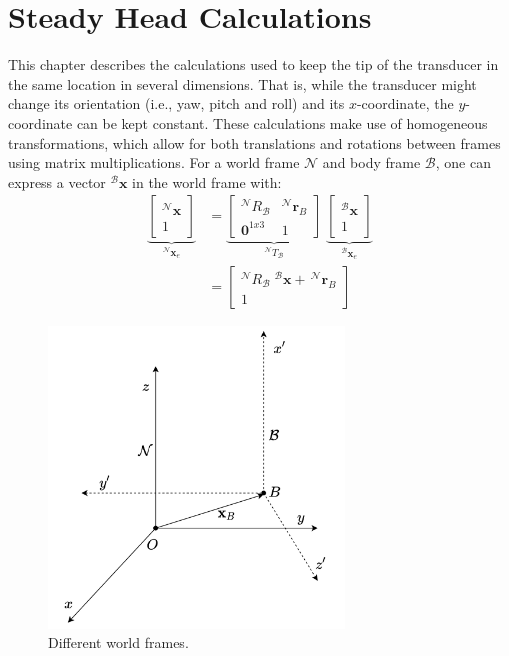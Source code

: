 \chapter{Steady Head Calculations}
\label{chap:SHC}
This chapter describes the calculations used to keep the tip of the transducer in the same location in several dimensions. That is, while the transducer might change its orientation (i.e., yaw, pitch and roll) and its $x$-coordinate, the $y$-coordinate can be kept constant. These calculations make use of homogeneous transformations, which allow for both translations and rotations between frames using matrix multiplications. For a world frame $\mathcal{N}$ and body frame $\mathcal{B}$, one can express a vector $^\mathcal{B}\mathbf{x}$ in the world frame with:
\begin{align}
    \underbrace{\left[\begin{array}{r} ^\mathcal{N}\mathbf{x}  \\ 1 \end{array}\right]}_{^\mathcal{N}\mathbf{x}_e}  &= \underbrace{\left[ \begin{array}{cc} ^\mathcal{N}R_\mathcal{B} &  ^\mathcal{N}\mathbf{r}_{B} \\ \mathbf{0}^{1x3} & 1 \end{array}  \right]}_{^\mathcal{N}T_\mathcal{B}} \; \underbrace{\left[\begin{array}{r} ^\mathcal{B}\mathbf{x}  \\ 1 \end{array}\right]}_{^\mathcal{B}\mathbf{x}_e} \label{eq: homTrans}\\
    &= \left[ \begin{array}{c}
         ^\mathcal{N}R_\mathcal{B}\; ^\mathcal{B}\mathbf{x} +\,  ^\mathcal{N}\mathbf{r}_{B} \\
         1
    \end{array} \right] \nonumber
\end{align}

\begin{figure}
    \centering
    \includegraphics[width=0.7\textwidth]{figures/SteadyHeadCalculations/SHC_transf.png}
    \caption{Different world frames.}
    \label{fig: world_frame}
\end{figure}

% 
% 